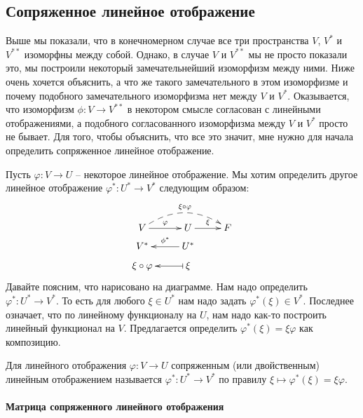 \subsection{Сопряженное линейное отображение}

Выше мы показали, что в конечномерном случае все три пространства $V$, $V^*$ и $V^{**}$ изоморфны между собой.
Однако, в случае $V$ и $V^{**}$ мы не просто показали это, мы построили некоторый замечательнейший изоморфизм между ними.
Ниже очень хочется объяснить, а что же такого замечательного в этом изоморфизме и почему подобного замечательного изоморфизма нет между $V$ и $V^*$.
Оказывается, что изоморфизм $\phi\colon V \to V^{**}$ в некотором смысле согласован с линейными отображениями, а подобного согласованного изоморфизма между $V$ и $V^*$ просто не бывает.
Для того, чтобы объяснить, что все это значит, мне нужно для начала определить сопряженное линейное отображение.

Пусть $\varphi\colon V\to U$ -- некоторое линейное отображение.
Мы хотим определить другое линейное отображение $\varphi^* \colon U^*\to V^*$ следующим образом:
\[
\xymatrix@R=6pt{
	{V}\ar[r]^{\varphi}\ar@{-->}@/^16pt/[rr]^{\xi\circ \varphi}&{U}\ar[r]^{\xi}&{F}\\
	{V^*}&{U^*}\ar[l]_{\phi^*}&{}\\
	{\xi\circ \varphi}&{\xi}\ar@{|->}[l]&{}\\
}
\]
Давайте поясним, что нарисовано на диаграмме.
Нам надо определить $\varphi^*\colon U^*\to V^*$.
То есть для любого $\xi\in U^*$ нам надо задать $\varphi^*(\xi)\in V^*$.
Последнее означает, что по линейному функционалу на $U$, нам надо как-то построить линейный функционал на $V$.
Предлагается определить $\varphi^*(\xi) = \xi \varphi$ как композицию.

\begin{definition}
Для линейного отображения $\varphi\colon V\to U$ сопряженным (или двойственным) линейным отображением называется $\varphi^*\colon U^*\to V^*$ по правилу $\xi \mapsto \varphi^*(\xi) = \xi \varphi$.
\end{definition}


\paragraph{Матрица сопряженного линейного отображения}

